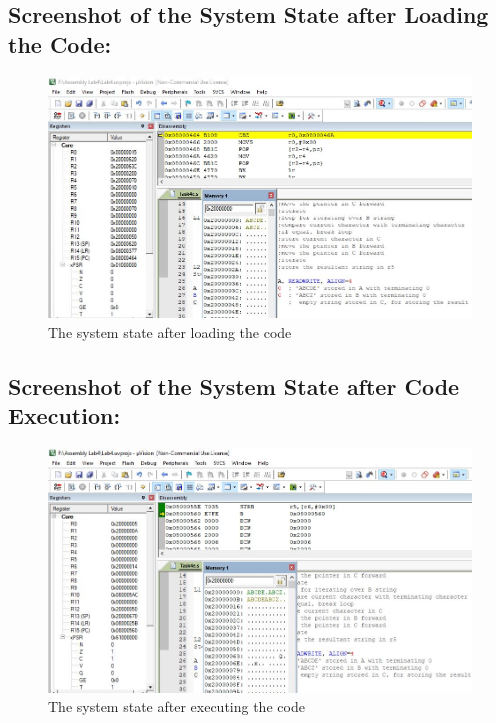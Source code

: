 \documentclass[12pt]{article}
\begin{document}
\subsection{Screenshot of the System State after Loading the Code:}
\begin{figure}[ht]
     \centering
     \includegraphics[scale=.7]{images/beforetask4e.JPG}
     \caption{The system state after loading the code}
     \label{fig:before_task_four_e}
 \end{figure}
 \pagebreak
 \subsection{Screenshot of the System State after Code Execution:}
 \begin{figure}[ht]
     \centering
     \includegraphics[scale=.7]{images/aftertask4e.JPG}
     \caption{The system state after executing the code}
     \label{fig:after_task_four_e}
 \end{figure}
 \pagebreak
\end{document}
